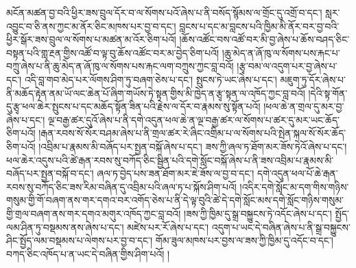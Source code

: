 མངོན་མཚན་བྱ་བའི་ཕྱིར་ཟས་བྲུལ་དོར་བ་ལ་སོགས་པའོ་ཞེས་པ་ནི་བསོད་སྙོམས་ལ་གྲོང་དུ་འགྲོ་བ་དང་། སླར་འབྱུང་བ་ཅི་ནས་ཀྱང་མ་ནོར་ཅིང་མཁས་པར་བྱ་བ་དང་། བླངས་པ་དང་མ་བླངས་པའི་ཁྱིམ་མི་ནོར་བར་བྱ་བའི་ཕྱིར་སྒོར་ཟས་བྲུལ་ལ་སོགས་པ་མཚན་མ་འོར་ཅིག་པའོ། །ཆོས་འཚོང་བས་འཚོ་བར་མི་བྱ་ཞེས་པ་ཆོས་བཤད་ཅིང་བསྟན་པའི་གླ་རྔན་གྱིས་འཚོ་བ་ལྟ་བུ་ཆོས་འཚོང་བར་མ་བྱེད་ཅིག་པའོ། །ཆུ་མེད་ན་ཞོ་ཁུ་ལ་སོགས་པས་རྐང་པ་བཀྲུ་ཞེས་པ་ནི་ཆུ་མེད་ན་ཞོ་ཁུ་ལ་སོགས་པས་རྐང་ལག་བཀྲུས་ཀྱང་བླ་བའོ། །རྩྭ་བམ་ལ་འདུག་པར་བྱ་ཞེས་པ་དང་། འདི་བླ་གབ་མེད་པར་ལོགས་ཤིག་ཏུ་བཞག་ཅེས་པ་དང་། སྤུངས་ཏེ་ཡང་ཞེས་པ་དང་། མཇུག་ཏུ་དོར་ཞེས་པ་ནི་མཆོད་རྟེན་ནམ་ཡོ་ལང་ཆེན་པོ་ཞིག་གཡོས་ཏེ་སྟན་གྱིས་མི་ཁྱེད་ན་རྩྭ་སྟན་ལ་འཁོད་ཀྱང་བླ་བའོ། །དེའི་སྟ་གོན་དུ་རྩྭ་ཕལ་ཆེར་སྤུངས་པ་དང་མཆོད་སྟོན་ཟིན་པའི་རྗེས་ལ་དོར་བ་རྣམས་སུ་སྟོན་པའོ། །ཕལ་ཆེ་ན་གྲལ་དུ་མར་བྱ་ཞེས་པ་དང་། ལྔ་བརྒྱ་ཚར་དུའོ་ཞེས་པ་ནི་དགེ་འདུན་ཕལ་ཆེ་ན་ལྔ་བརྒྱ་ཚར་ལ་སོགས་པ་ཚར་དུ་མར་ཡང་ཆོད་ཅིག་པའོ། །རྒན་རབས་སོ་སོར་བཤམ་ཞེས་པ་ནི་གྲལ་ཚར་རེ་ཞིང་འགྲིམ་པ་ལ་སོགས་པའི་སྤེན་སྐལ་སོ་སོར་ཆོད་ཅིག་པའོ། །འབྲིམ་པ་རྣམས་མི་བཞོད་པར་སྤྱན་བསྐོ་ཞེས་པ་དང་། ཟས་ཀྱི་ཞལ་ཏ་ཐོག་མར་ཟོས་ཏེའོ་ཞེས་པ་དང་། ཕལ་ཆེར་འདུས་པའི་ཚེ་རྒན་རབས་སུ་བཀོད་ཅིང་སྦྱིན་པའི་དགེ་སློང་བསྐོ་ཞེས་པ་ནི་ཟས་འབྲིམ་པ་རྣམས་མི་བཞོད་པར་སྤྱན་བསྐོ་བ་དང་། ཞལ་ཏ་བྱེད་པས་ཟན་ཐོག་མར་ཇེ་ཟོས་ལ་བྱ་བ་དང་། དགེ་འདུན་ཕལ་པོ་ཆེ་རྒན་རབས་སུ་བཀོད་ཅིང་ཟས་རིམ་བཞིན་དུ་འབྲིམ་པའི་ཞལ་ཏ་པ་སྐོས་ཤིག་པའོ། །འདིར་དགེ་སློང་མ་དག་གིས་གཉིས་གསུམ་གྱི་གོ་བཞག་ནས་གར་དགའ་བར་འགོད་ཅེས་པ་ནི་དེ་ལྟ་བུའི་ཚེ་དེ་དགེ་སློང་མས་དགེ་སློང་གཉིས་གསུམ་གྱི་གྲལ་བཞག་ནས་གར་དགའ་མགུར་འཁོད་ཀྱང་བླ་བའོ། །ཟས་ཀྱི་ཁྱིམ་དུ་སྒྲ་བསྐྱུངས་ཏེ་འདོང་ཞེས་པ་དང་། སྤྱོད་ལམ་ཤིན་ཏུ་བསྡམས་ནས་ཞེས་པ་དང་། མཛེས་པར་རོ་ཞེས་པ་དང་། འདུག་པ་ཡང་དེ་བཞིན་ཞེས་པ་ནི་སྒྲ་བསྐྱུངས་ཤིང་སྤྱོད་ལམ་བསྡམས་པ་ལེགས་པར་བྱ་བ་དང་། གོམ་ཟུལ་མཁས་པར་བྱས་ལ་ཟས་ཀྱི་ཁྱིམ་དུ་འདོང་བ་དང་། བཀད་ཅིང་འཁོད་པ་ན་ཡང་དེ་བཞིན་གྱིས་ཤིག་པའོ། །
